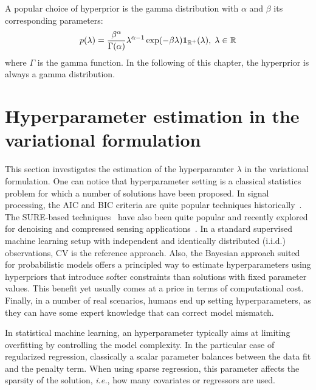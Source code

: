 A popular choice of hyperprior is the gamma distribution with $\alpha$ and $\beta$ its corresponding parameters:
\begin{equation} \label{eq:gamma_dist}
	p(\lambda) = \frac{\beta^\alpha}{\Gamma(\alpha)}\lambda^{\alpha-1}\exp(-\beta\lambda)\mathbf{1}_{\mathbb{R}^+}(\lambda), \; \lambda \in \mathbb{R}
\end{equation}
where $\Gamma$ is the gamma function. In the following of this chapter, the hyperprior is always a gamma distribution.


\section{Hyperparameter estimation in the variational formulation}

This section investigates the estimation of the hyperparamter $\lambda$ in the variational formulation. One can notice that hyperparameter setting is a classical statistics problem for which a number of solutions have been proposed. In signal processing, the \ac{AIC} and \ac{BIC} criteria are quite popular techniques historically~\cite{schwarz1978estimating}. The SURE-based techniques~\cite{stein1981estimation} have also been quite popular and recently explored for denoising and compressed sensing applications~\cite{luisier2007new, guo2015near}. In a standard supervised machine learning setup with independent and identically distributed (i.i.d.) observations, \ac{CV} is the reference approach. 
Also, the Bayesian approach suited for probabilistic models offers a principled way to estimate hyperparameters using hyperpriors that introduce softer constraints than solutions with fixed parameter values. This benefit yet usually comes at a price in terms of computational cost. Finally, in a number of real scenarios, humans end up setting hyperparameters, as they can have some expert knowledge that can correct model mismatch.

In statistical machine learning, an hyperparameter typically aims at limiting overfitting by controlling the model complexity. In the particular case of regularized regression, classically a scalar parameter balances between the data fit and the penalty term. When using sparse regression, this parameter affects the sparsity of the solution, \emph{i.e.}, how many covariates or regressors are used.

